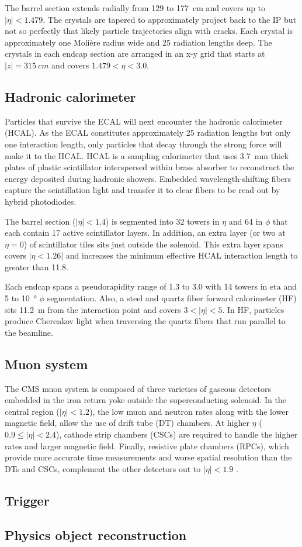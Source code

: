 The barrel section extends radially from \num{129} to \SI{177}{cm} and covers up to $|\eta|<1.479$. The crystals are tapered to approximately project back to the IP but not so perfectly that likely particle trajectories align with cracks. Each crystal is approximately one Moli\`ere radius wide and 25 radiation lengths deep. The crystals in each endcap section are arranged in an x-y grid that starts at $\lvert z \rvert = \SI{315}{cm}$ and covers $1.479<\eta<3.0$.

\subsection{Hadronic calorimeter}
Particles that survive the ECAL will next encounter the hadronic calorimeter (HCAL). As the ECAL constitutes approximately 25 radiation lengths but only one interaction length, only particles that decay through the strong force will make it to the HCAL. HCAL is a sampling calorimeter that uses \SI{3.7}{\milli\metre} thick plates of plastic scintillator interspersed within brass absorber to reconstruct the energy deposited during hadronic showers. Embedded wavelength-shifting fibers capture the scintillation light and transfer it to clear fibers to be read out by hybrid photodiodes.

The barrel section ($|\eta|<1.4$) is segmented into \num{32} towers in $\eta$ and \num{64} in $\phi$ that each contain 17 active scintillator layers. In addition, an extra layer (or two at $\eta = \num{0}$) of scintillator tiles sits just outside the solenoid. This extra layer spans covers $|\eta<1.26|$ and increases the minimum effective HCAL interaction length to greater than \num{11.8}.

Each endcap spans a pseudorapidity range of \num{1.3} to \num{3.0} with \num{14} towers in eta and \num{5} to \SI{10}{\degree} $\phi$ segmentation. Also, a steel and quartz fiber forward calorimeter (HF) sits \SI{11.2}{m} from the interaction point and covers $3<|\eta|<5$. In HF, particles produce Cherenkov light when traversing the quartz fibers that run parallel to the beamline.


\subsection{Muon system}
The CMS muon system is composed of three varieties of gaseous detectors embedded in the iron return yoke outside the superconducting solenoid. In the central region ($|\eta|<1.2$), the low muon and neutron rates along with the lower magnetic field, allow the use of drift tube (DT) chambers. At higher $\eta$ ($0.9\leq|\eta|<2.4$), cathode strip chambers (CSCs) are required to handle the higher rates and larger magnetic field. Finally, resistive plate chambers (RPCs), which provide more accurate time measurements and worse spatial resolution than the DTs and CSCs, complement the other detectors out to $|\eta|<1.9$ \cite{cms_tdr_v1, cms_ms_performance}. 

\subsection{Trigger}
\label{trigger}

\subsection{Physics object reconstruction}
